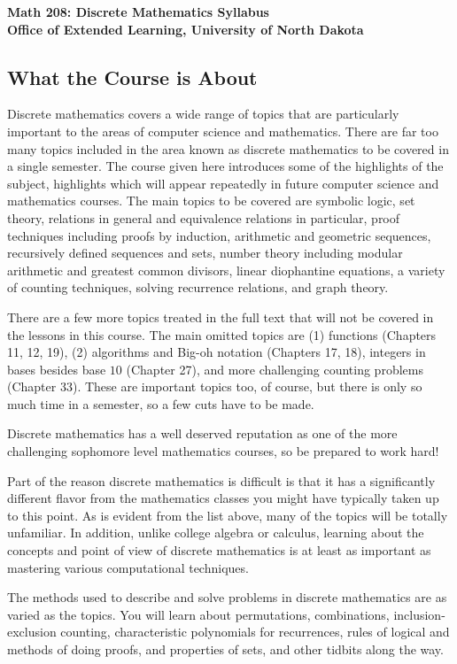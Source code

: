 \documentclass[11pt]{amsart}
\begin{document}
\begin{center}
{\bfseries Math 208: Discrete Mathematics Syllabus \\
Office of Extended Learning,  University of North Dakota}
\end{center}

\subsection{What the Course is About}
Discrete mathematics covers a wide range of topics that are particularly
important to the areas of computer science and mathematics.  There are far
too many topics included in the area known as discrete mathematics to be
covered in a single semester.  The course given here introduces some of the
highlights of the subject, highlights which will appear repeatedly in
future computer science and mathematics courses.  The main topics to be
covered are symbolic logic, set theory,
relations in general and equivalence relations in particular, proof techniques including proofs by induction, arithmetic and geometric sequences, recursively defined sequences and sets,  number theory including modular arithmetic and greatest common divisors, linear diophantine equations, a variety of counting techniques, solving recurrence relations, and graph theory. 

There are a few more topics treated in the full text that will not be covered in the lessons in this course.
The main omitted topics are  (1) functions (Chapters 11, 12, 19), (2) algorithms and Big{-}oh notation (Chapters 17, 18), integers in bases besides base $10$ (Chapter 27),  and more
challenging counting problems (Chapter 33).   These are important topics too, of course, but there is only so much time in a semester, so a few cuts have to be made.  


Discrete mathematics has a well deserved reputation as one of the more challenging
sophomore level mathematics courses, so be prepared to work hard! 

Part of the reason discrete mathematics is difficult is that it has a significantly different
flavor from the mathematics classes you might have typically taken up to this point.
As is evident from the list  above, many of the topics will be totally unfamiliar. In addition, 
unlike college algebra or calculus, learning about
the concepts and point of view of discrete mathematics is at least as
important as mastering various computational techniques. 

The methods used to describe and solve problems in discrete
mathematics are as varied as the topics.  You will learn about permutations,
combinations, inclusion{-}exclusion counting, 
characteristic polynomials for recurrences, rules of logical and methods of doing
proofs, and properties of sets, and other tidbits along the
way. 
\end{document}
